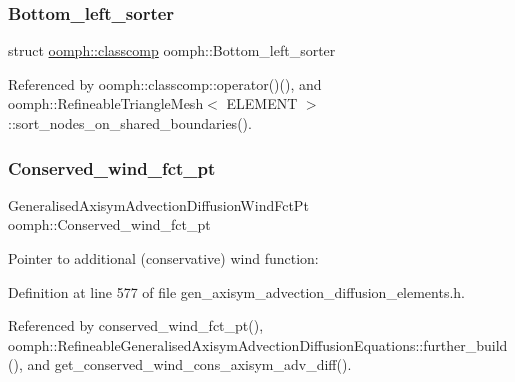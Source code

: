 \mbox{\label{namespaceoomph_a14c756ede5a394b4c6cbf49448813b7e}} 
\subsubsection{\texorpdfstring{Bottom\+\_\+left\+\_\+sorter}{Bottom\_left\_sorter}}
{\footnotesize\ttfamily struct \hyperlink{structoomph_1_1classcomp}{oomph\+::classcomp}  oomph\+::\+Bottom\+\_\+left\+\_\+sorter}



Referenced by oomph\+::classcomp\+::operator()(), and oomph\+::\+Refineable\+Triangle\+Mesh$<$ E\+L\+E\+M\+E\+N\+T $>$\+::sort\+\_\+nodes\+\_\+on\+\_\+shared\+\_\+boundaries().

\mbox{\label{namespaceoomph_a2453d7b0c71b0b9039b1f025226fad27}} 
\subsubsection{\texorpdfstring{Conserved\+\_\+wind\+\_\+fct\+\_\+pt}{Conserved\_wind\_fct\_pt}}
{\footnotesize\ttfamily Generalised\+Axisym\+Advection\+Diffusion\+Wind\+Fct\+Pt oomph\+::\+Conserved\+\_\+wind\+\_\+fct\+\_\+pt\hspace{0.3cm}{\ttfamily [protected]}}



Pointer to additional (conservative) wind function\+: 



Definition at line 577 of file gen\+\_\+axisym\+\_\+advection\+\_\+diffusion\+\_\+elements.\+h.



Referenced by conserved\+\_\+wind\+\_\+fct\+\_\+pt(), oomph\+::\+Refineable\+Generalised\+Axisym\+Advection\+Diffusion\+Equations\+::further\+\_\+build(), and get\+\_\+conserved\+\_\+wind\+\_\+cons\+\_\+axisym\+\_\+adv\+\_\+diff().

\mbox{\label{namespaceoomph_acf24e85e104eb2295a9c8c6f77ada393}} 
